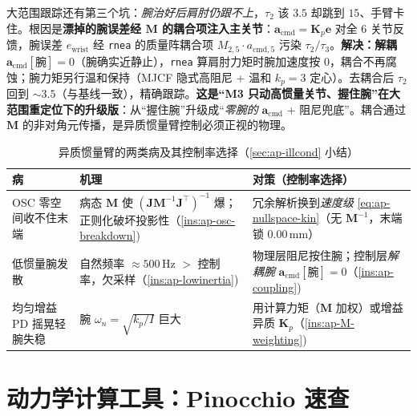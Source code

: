 \begin{insight}\label{ins:ap-coupling}
大范围跟踪还有第三个坑：\emph{腕治好后肩肘仍跟不上}，$\tau_2$ 该 $3.5$ 却跳到 $15$、手臂卡住。根因是\textbf{漂掉的腕误差经 $\mathbf{M}$ 的耦合项注入主关节}：$\mathbf{a}_{\mathrm{cmd}}=\mathbf{K}_p\mathbf{e}$ 对全 $6$ 关节反馈，腕误差 $e_{\mathrm{wrist}}$ 经 \texttt{rnea} 的质量阵耦合项 $M_{2,5}\cdot a_{\mathrm{cmd},5}$ 污染 $\tau_2/\tau_3$。\textbf{解决：解耦} $\mathbf{a}_{\mathrm{cmd}}[\text{腕}]=0$（腕确实近静止），\texttt{rnea} 算肩肘力矩时腕加速度按 $0$，耦合不再腐蚀；腕力矩另行温和保持（MJCF 隐式高阻尼 + 温和 $k_p=3$ 定心）。去耦合后 $\tau_2$ 回到 $\sim3.5$（与基线一致），精确跟踪。\textbf{这是“M3 只动高惯量关节、握住腕”在大范围重定位下的升级版}：从“握住腕”升级成“\emph{零腕的} $\mathbf{a}_{\mathrm{cmd}}$ + 阻尼兜底”。耦合通过 $\mathbf{M}$ 的非对角元传播，是异质惯量臂控制必须正视的物理。
\end{insight}

\begin{table}[H]\centering\small
\caption{异质惯量臂的两类病及其控制率选择（\cref{sec:ap-illcond} 小结）}
\begin{tabular}{p{} p{} p{}}
\toprule
病 & 机理 & 对策（控制率选择）\\
\midrule
OSC 零空间收不住末端 & 病态 $\mathbf{M}$ 使 $(\mathbf{J}\mathbf{M}^{-1}\mathbf{J}^\top)^{-1}$ 爆；正则化破坏投影性（\cref{ins:ap-osc-breakdown})& 冗余解析换到\emph{速度级} \cref{eq:ap-nullspace-kin}（无 $\mathbf{M}^{-1}$，末端锁 $0.00\,\mathrm{mm}$）\\
低惯量腕发散 & 自然频率 $\approx500\,\mathrm{Hz}$ $>$ 控制率，欠采样（\cref{ins:ap-lowinertia})& 物理层阻尼按住腕；控制层\emph{解耦腕} $\mathbf{a}_{\mathrm{cmd}}[\text{腕}]=0$（\cref{ins:ap-coupling})\\
均匀增益 PD 摇晃轻腕失稳 & 腕 $\omega_n=\sqrt{k_p/I}$ 巨大 & 用计算力矩（$\mathbf{M}$ 加权）或增益异质 $\mathbf{K}_p$（\cref{ins:ap-M-weighting})\\
\bottomrule
\end{tabular}
\label{tab:ap-illcond}
\end{table}

\section{动力学计算工具：Pinocchio 速查}
\label{sec:ap-pinocchio}

